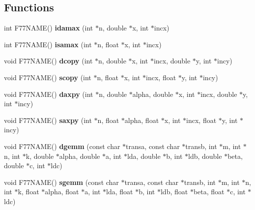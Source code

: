 \subsection*{Functions}
\begin{DoxyCompactItemize}
\item 
int F77\-N\-A\-M\-E() {\bfseries idamax} (int $\ast$n, double $\ast$x, int $\ast$incx)\label{blas__stuff_8h_a66cabba1ac4373e8498d5f6e1fb3b1f2}

\item 
int F77\-N\-A\-M\-E() {\bfseries isamax} (int $\ast$n, float $\ast$x, int $\ast$incx)\label{blas__stuff_8h_aa42319c4154b7cebd2df2c9244289ae0}

\item 
void F77\-N\-A\-M\-E() {\bfseries dcopy} (int $\ast$n, double $\ast$x, int $\ast$incx, double $\ast$y, int $\ast$incy)\label{blas__stuff_8h_ae8a8438f6e0e9d30372d675dd220d379}

\item 
void F77\-N\-A\-M\-E() {\bfseries scopy} (int $\ast$n, float $\ast$x, int $\ast$incx, float $\ast$y, int $\ast$incy)\label{blas__stuff_8h_ad2cb0af1768f034288ceb26ee34aa4d0}

\item 
void F77\-N\-A\-M\-E() {\bfseries daxpy} (int $\ast$n, double $\ast$alpha, double $\ast$x, int $\ast$incx, double $\ast$y, int $\ast$incy)\label{blas__stuff_8h_af36d165a6d25c8420e679954723a7b8e}

\item 
void F77\-N\-A\-M\-E() {\bfseries saxpy} (int $\ast$n, float $\ast$alpha, float $\ast$x, int $\ast$incx, float $\ast$y, int $\ast$incy)\label{blas__stuff_8h_a5ad2d43cf46f42b980f9d51c0543cef9}

\item 
void F77\-N\-A\-M\-E() {\bfseries dgemm} (const char $\ast$transa, const char $\ast$transb, int $\ast$m, int $\ast$n, int $\ast$k, double $\ast$alpha, double $\ast$a, int $\ast$lda, double $\ast$b, int $\ast$ldb, double $\ast$beta, double $\ast$c, int $\ast$ldc)\label{blas__stuff_8h_ab1457f7cd5621a26837f99863b4bb4c4}

\item 
void F77\-N\-A\-M\-E() {\bfseries sgemm} (const char $\ast$transa, const char $\ast$transb, int $\ast$m, int $\ast$n, int $\ast$k, float $\ast$alpha, float $\ast$a, int $\ast$lda, float $\ast$b, int $\ast$ldb, float $\ast$beta, float $\ast$c, int $\ast$ldc)\label{blas__stuff_8h_ad16a1af4831140a3947ddee4358b92a0}


\end{DoxyCompactItemize}
